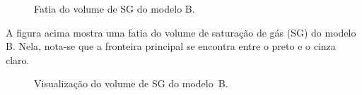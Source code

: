 \begin{figure}[h]
	\centering
	\caption{Fatia do volume de SG do modelo B.}
\end{figure}

	A figura acima mostra uma fatia do volume de saturação de gás (SG) do modelo B. Nela, nota-se que a fronteira principal se encontra entre o preto e o cinza claro.

\begin{figure}[h]
	\centering
	\caption{Visualização do volume de SG do modelo~B.}
	\label{fig:r_box_sg}
\end{figure}

